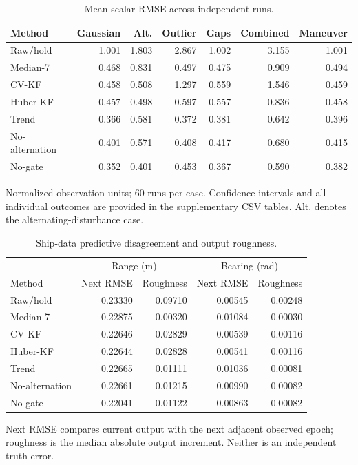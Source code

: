 \begin{table}[htbp]\centering
\caption{Mean scalar RMSE across independent runs.}\label{tab:sim}
{\small\renewcommand{\baselinestretch}{1}\selectfont
\begin{tabular}{lrrrrrr}\hline
Method & Gaussian & Alt. & Outlier & Gaps & Combined & Maneuver\\\hline
Raw/hold & 1.001 & 1.803 & 2.867 & 1.002 & 3.155 & 1.001\\
Median-7 & 0.468 & 0.831 & 0.497 & 0.475 & 0.909 & 0.494\\
CV-KF & 0.458 & 0.508 & 1.297 & 0.559 & 1.546 & 0.459\\
Huber-KF & 0.457 & 0.498 & 0.597 & 0.557 & 0.836 & 0.458\\
Trend & 0.366 & 0.581 & 0.372 & 0.381 & 0.642 & 0.396\\
No-alternation & 0.401 & 0.571 & 0.408 & 0.417 & 0.680 & 0.415\\
No-gate & 0.352 & 0.401 & 0.453 & 0.367 & 0.590 & 0.382\\
\hline\end{tabular}}
\par\small Normalized observation units; 60 runs per case. Confidence intervals and all individual outcomes are provided in the supplementary CSV tables. Alt. denotes the alternating-disturbance case.
\end{table}
\begin{table}[htbp]\centering
\caption{Ship-data predictive disagreement and output roughness.}\label{tab:real}
{\small\renewcommand{\baselinestretch}{1}\selectfont
\begin{tabular}{lrrrr}\hline
&\multicolumn{2}{c}{Range (m)}&\multicolumn{2}{c}{Bearing (rad)}\\
Method & Next RMSE & Roughness & Next RMSE & Roughness\\\hline
Raw/hold & 0.23330 & 0.09710 & 0.00545 & 0.00248\\
Median-7 & 0.22875 & 0.00320 & 0.01084 & 0.00030\\
CV-KF & 0.22646 & 0.02829 & 0.00539 & 0.00116\\
Huber-KF & 0.22644 & 0.02828 & 0.00541 & 0.00116\\
Trend & 0.22665 & 0.01111 & 0.01036 & 0.00081\\
No-alternation & 0.22661 & 0.01215 & 0.00990 & 0.00082\\
No-gate & 0.22041 & 0.01122 & 0.00863 & 0.00082\\
\hline\end{tabular}}
\par\small Next RMSE compares current output with the next adjacent observed epoch; roughness is the median absolute output increment. Neither is an independent truth error.
\end{table}
